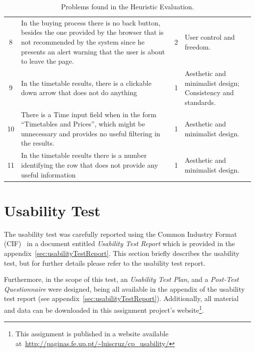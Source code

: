 \documentclass[a4paper]{article}
\begin{document}
\begin{table}[h]
\begin{center}
\begin{tabular}{c | p{8cm} | c | p{4.5cm}}
8 & In the buying process there is no back button, besides the one provided by the browser that is not recommended by the system since he presents an alert warning that the user is about to leave the page. & \cellcolor{orange!20}2 & User control and freedom.\\

9  &  In the timetable results, there is a clickable down arrow that does not do anything  & \cellcolor{yellow!10} 1 &  Aesthetic and minimalist design; Consistency and standards.  \\

	10  &  There is a Time input field when in the form ``Timetables and Prices'', which might be unnecessary and provides no useful filtering in the results.  & \cellcolor{yellow!10} 1 &  Aesthetic and minimalist design.  \\
	
		11 &  In the timetable results there is a number identifying the row that does not provide any useful information & \cellcolor{yellow!10} 1 & Aesthetic and minimalist design.\\
	
\hline
\end{tabular}
\end{center}
\caption{Problems found in the Heuristic Evaluation.}
\label{tab:heuristic_results}
\end{table}


\section{Usability Test}
\label{sec:usability_test}

The usability test was carefully reported using the Common Industry Format (CIF)~\citep{iusr2006cif} in a document entitled \emph{Usability Test Report} which is provided in the appendix~\ref{sec:usabilityTestReport}. This section briefly describes the usability test, but for further details please refer to the usability test report.

Furthermore, in the scope of this test, an \emph{Usability Test Plan}, and a \emph{Post-Test Questionnaire} were designed, being all available in the appendix of the usability test report (see appendix~\ref{sec:usabilityTestReport}). Additionally, all material and data can be downloaded in this assignment project's website\footnote{This assignment is published in a website available at~\url{http://paginas.fe.up.pt/~luiscruz/cp_usability/}}.
\end{document}

